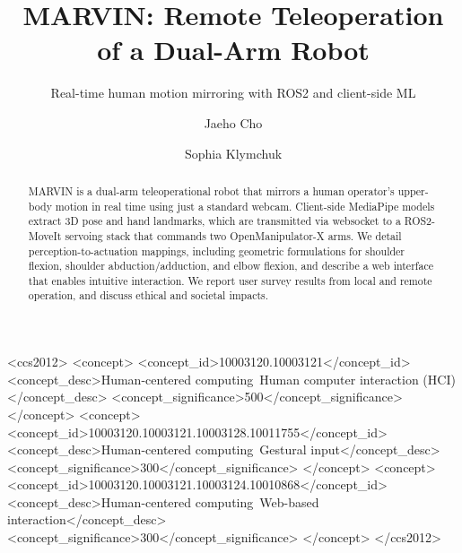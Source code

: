 \documentclass[acmsmall, screen]{acmart}
\begin{document}
\title{MARVIN: Remote Teleoperation of a Dual-Arm Robot}
\subtitle{Real-time human motion mirroring with ROS2 and client-side ML}

\author{Jaeho Cho}
\author{Sophia Klymchuk}
\authornotemark[1]

\renewcommand{\shortauthors}{Cho and Klymchuk}

\begin{abstract}
MARVIN is a dual-arm teleoperational robot that mirrors a human operator's upper-body motion in real time using just a standard webcam. Client-side MediaPipe models extract 3D pose and hand landmarks, which are transmitted via websocket to a ROS2-MoveIt servoing stack that commands two OpenManipulator-X arms. We detail perception-to-actuation mappings, including geometric formulations for shoulder flexion, shoulder abduction/adduction, and elbow flexion, and describe a web interface that enables intuitive interaction. We report user survey results from local and remote operation, and discuss ethical and societal impacts.
\end{abstract}

\begin{CCSXML}
<ccs2012>
   <concept>
       <concept_id>10003120.10003121</concept_id>
       <concept_desc>Human-centered computing~Human computer interaction (HCI)</concept_desc>
       <concept_significance>500</concept_significance>
       </concept>
   <concept>
       <concept_id>10003120.10003121.10003128.10011755</concept_id>
       <concept_desc>Human-centered computing~Gestural input</concept_desc>
       <concept_significance>300</concept_significance>
       </concept>
   <concept>
       <concept_id>10003120.10003121.10003124.10010868</concept_id>
       <concept_desc>Human-centered computing~Web-based interaction</concept_desc>
       <concept_significance>300</concept_significance>
       </concept>
 </ccs2012>
\end{CCSXML}

\end{document}
